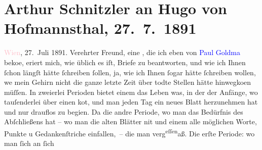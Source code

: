 

               \section[Arthur Schnitzler an Hugo von Hofmannsthal, 27. 7. 1891]{ Arthur Schnitzler an Hugo von Hofmannsthal, 27. 7. 1891}\nopagebreak{}\rehead{ }\normalsize\beginnumbering{} \toendnotes[C]{\smallbreak\pagebreak[2]} 
\toendnotes[C]{\smallbreak}\pstart
           \raggedleft{}{\pb}\textcolor{pink}{Wien}{}\ledrightnote{\textcolor{pink}{Wien}}, 27. Juli
                  1891.\pend
           \pstart
           Verehrter Freund, eine \label{K_L00025-3v}\label{K_L00025-3h}, die ich eben von \textcolor{blue}{Paul Goldma{\geminationn}}{}\ledrightnote{\textcolor{blue}{Paul Goldmann}} beko{\geminationm}e, eri{\geminationn}ert mich,
               wie üblich es iſt, Briefe zu beantworten, und wie ich Ihnen ſchon längſt hätte
               ſchreiben ſollen, ja, wie ich Ihnen ſogar hätte ſchreiben wollen, we{\geminationn} mein Gehirn nicht die ganze letzte Zeit über todte
               Stellen hätte hinwegko{\geminationm}en müſſen. In zweierlei Perioden
               bietet einem das Leben was, in der der Anfänge, wo tauſenderlei über einen ko{\geminationm}t, und man {\pb}jeden Tag ein
               neues Blatt herzunehmen hat und nur drauflos zu begi{\geminationn}en.
                  Da{\geminationn} die andre Periode, wo man das Bedürfnis des
               Abſchließens hat – wo man die alten Blätter ni{\geminationm}t und
               einem alle möglichen Worte, Punkte u Gedankenſtriche einfallen, – die man verg\substVorne{}\textsuperscript{eſſen}\substDazwischen{}aß\substHinten{}{ }. Die erſte Periode: wo man ſich an ſich
